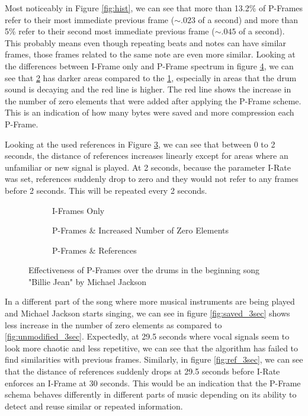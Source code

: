 Most noticeably in Figure \ref{fig:hist}, we can see that more than 13.2\% of P-Frames refer to their most immediate previous frame ($\sim .023$ of a second) and more than 5\% refer to their second most immediate previous frame ($\sim .045$ of a second). This probably means even though repeating beats and notes can have similar frames, those frames related to the same note are even more similar. Looking at the differences between I-Frame only and P-Frame spectrum in figure \ref{fig:billie_jean_25sec}, we can see that \ref{fig:saved_25sec} has darker areas compared to the \ref{fig:unmodified_25sec}, especially in areas that the drum sound is decaying and the red line is higher. The red line shows the increase in the number of zero elements that were added after applying the P-Frame scheme. This is an indication of how many bytes were saved and more compression each P-Frame.

Looking at the used references in Figure \ref{fig:ref_25sec}, we can see that between 0 to 2 seconds, the distance of references increases linearly except for areas where an unfamiliar or new signal is played. At 2 seconds, because the parameter I-Rate was set, references suddenly drop to zero and they would not refer to any frames before 2 seconds. This will be repeated every 2 seconds.

\begin{figure}[ht]
\centering
\begin{subfigure}{0.30\textwidth}
    
    \caption{I-Frames Only}
    \label{fig:unmodified_25sec}
\end{subfigure}
\hfill
\begin{subfigure}{0.32\textwidth}
    
    \caption{P-Frames \& Increased Number of Zero Elements}
    \label{fig:saved_25sec}
\end{subfigure}
\hfill
\begin{subfigure}{0.32\textwidth}
    
    \caption{P-Frames \& References}
    \label{fig:ref_25sec}
\end{subfigure}
\caption{Effectiveness of P-Frames over the drums in the beginning song "Billie Jean" by Michael Jackson}
\label{fig:billie_jean_25sec}
\end{figure}

In a different part of the song where more musical instruments are being played and Michael Jackson starts singing, we can see in figure \ref{fig:saved_3sec} shows less increase in the number of zero elements as compared to \ref{fig:unmodified_3sec}. Expectedly, at 29.5 seconds where vocal signals seem to look more chaotic and less repetitive, we can see that the algorithm has failed to find similarities with previous frames. Similarly, in figure \ref{fig:ref_3sec}, we can see that the distance of references suddenly drops at 29.5 seconds before I-Rate enforces an I-Frame at 30 seconds. This would be an indication that the P-Frame schema behaves differently in different parts of music depending on its ability to detect and reuse similar or repeated information.

